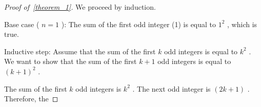 \documentclass{article}
\begin{document}
\begin{proof}[Proof of~{\autoref{theorem_1}}]
\label{proof:theorem_1}
We proceed by induction.

Base case ( $n = 1$ ): The sum of the first odd integer (1) is equal to  $1^2$ , which is true.

Inductive step: Assume that the sum of the first  $k$  odd integers is equal to  $k^2$ . We want to show that the sum of the first  $k+1$  odd integers is equal to  $(k+1)^2$ .

The sum of the first  $k$  odd integers is  $k^2$ . The next odd integer is  $(2k+1)$ . Therefore, the


\end{proof}


\printbibliography
\end{document}
